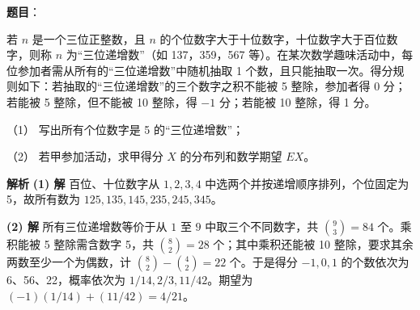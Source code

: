 \begin{answer}

\textbf{题目}：

若 $n$ 是一个三位正整数，且 $n$ 的个位数字大于十位数字，十位数字大于百位数字，则称 $n$ 为“三位递增数”（如 137，359，567 等）。在某次数学趣味活动中，每位参加者需从所有的“三位递增数”中随机抽取 1 个数，且只能抽取一次。得分规则如下：若抽取的“三位递增数”的三个数字之积不能被 5 整除，参加者得 0 分；若能被 5 整除，但不能被 10 整除，得 $-1$ 分；若能被 10 整除，得 1 分。

（1） 写出所有个位数字是 5 的“三位递增数”；

（2） 若甲参加活动，求甲得分 $X$ 的分布列和数学期望 $EX$。

\textbf{解析}
\textbf{(1) 解}
百位、十位数字从 $1,2,3,4$ 中选两个并按递增顺序排列，个位固定为 5，故所有数为 $125,135,145,235,245,345$。

\textbf{(2) 解}
所有三位递增数等价于从 $1$ 至 $9$ 中取三个不同数字，共 $\binom93=84$ 个。乘积能被 5 整除需含数字 5，共 $\binom82=28$ 个；其中乘积还能被 10 整除，要求其余两数至少一个为偶数，计 $\binom82-\binom42=22$ 个。于是得分 $-1,0,1$ 的个数依次为 6、56、22，概率依次为 $1/14,2/3,11/42$。期望为 $(-1)(1/14)+(11/42)=4/21$。



\end{answer}
